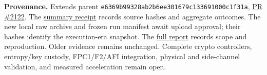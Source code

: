 \documentclass[10pt]{article}
\newcommand{\repo}{https://github.com/aburan28/crypto/blob/codex/envoy-fpga-crypto-pq-20261017/integrations/envoy-fpga-crypto/}
\begin{document}
\textbf{Provenance.} Extends parent
\texttt{e6369b99328ab2b6ee301679c133691000c1f31a},
\href{https://github.com/aburan28/crypto/pull/2122}{PR \#2122}.
The \href{\repo docs/receipts/2026-10-18-ci-compat/README.md}{summary receipt}
records source hashes and aggregate outcomes. The new local raw archive and
frozen run manifest await upload approval; their hashes identify the
execution-era snapshot. The
\href{\repo docs/reports/2026-10-18-ci-compat/README.md}{full report}
records scope and reproduction. Older evidence remains unchanged.
Complete crypto controllers, entropy/key custody, FPC1/F2/AFI integration,
physical and side-channel validation, and measured acceleration remain open.
\end{document}

